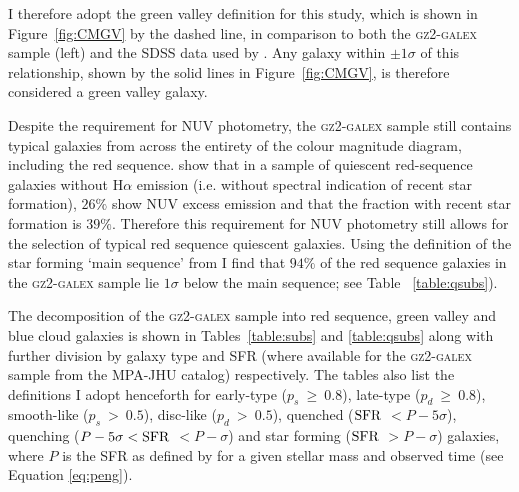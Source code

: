 I therefore adopt the \citet{Baldry04} green valley definition for this study, which is shown in Figure~\ref{fig:CMGV} by the dashed line, in comparison to both the \textsc{gz2-galex} sample (left) and the SDSS data used by \citet[][right]{Baldry04}. Any galaxy within $\pm 1\sigma$ of this relationship, shown by the solid lines in Figure~\ref{fig:CMGV}, is therefore considered a green valley galaxy. 

Despite the requirement for NUV photometry, the \textsc{gz2-galex} sample still contains typical galaxies from across the entirety of the colour magnitude diagram, including the red sequence. \cite{ko13} show that in a sample of quiescent red-sequence galaxies without $\mathrm{H}\alpha$ emission (i.e. without spectral indication of recent star formation), $26\%$ show NUV excess emission and that the fraction with recent star formation is $39\%$. Therefore this requirement for NUV photometry still allows for the selection of typical red sequence quiescent galaxies. Using the definition of the star forming `main sequence' from \citet[][see Section~\ref{qmod}]{peng10} I find that $94\%$ of the red sequence galaxies in the \textsc{gz2-galex} sample lie $1\sigma$ below the main sequence; see Table ~\ref{table:qsubs}). 

The decomposition of the \textsc{gz2-galex} sample into red sequence, green valley and blue cloud galaxies is shown in Tables~\ref{table:subs} and \ref{table:qsubs} along with further division by galaxy type and SFR (where available for the \textsc{gz2-galex} sample from the MPA-JHU catalog) respectively. The tables also list the definitions I adopt henceforth for early-type ($p_s~ \geq~0.8$), late-type ($p_d~ \geq~0.8$), smooth-like ($p_s~ >~0.5$), disc-like ($p_d~ >~0.5$), quenched ($\rm{SFR}$ $ < P - 5\sigma$), quenching ($P - 5\sigma < \rm{SFR}$ $< P - \sigma$) and star forming  ($\rm{SFR}$ $> P -\sigma$) galaxies, where $P$ is the SFR as defined by \citet{peng10} for a given stellar mass and observed time (see Equation \ref{eq:peng}). 

